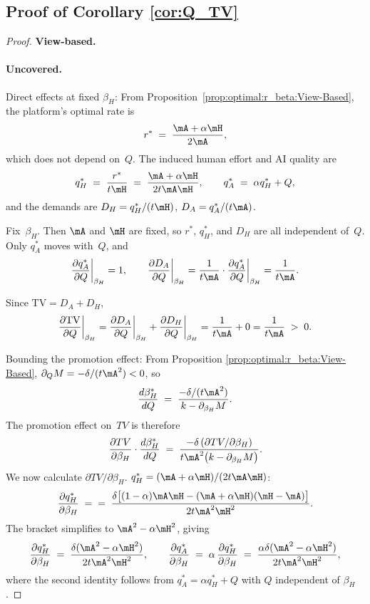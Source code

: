 \subsection*{Proof of Corollary \ref{cor:Q_TV}}
\begin{proof}
\textbf{View-based.}
\paragraph{Uncovered.}

Direct effects at fixed $\beta_H$:
From Proposition~\ref{prop:optimal:r_beta:View-Based}, the platform's optimal rate is
\[
r^* \;=\; \frac{\mA + \alpha \mH}{2\mA},
\]
which does not depend on~$Q$. The induced human effort and AI quality are
\[
q_H^* \;=\; \frac{r^*}{t\mH} \;=\; \frac{\mA + \alpha \mH}{2t\mA\mH}, 
\qquad
q_A^* \;=\; \alpha q_H^* + Q,
\]
and the demands are $D_H = q_H^*/(t\mH)$, $D_A = q_A^*/(t\mA)$.

Fix~$\beta_H$. Then $\mA$ and $\mH$ are fixed, so $r^*$, $q_H^*$, and $D_H$ are all independent of~$Q$. Only $q_A^*$ moves with~$Q$, and
\[
\frac{\partial q_A^*}{\partial Q}\bigg|_{\beta_H} = 1,
\qquad
\frac{\partial D_A}{\partial Q}\bigg|_{\beta_H}
= \frac{1}{t\mA}\cdot\frac{\partial q_A^*}{\partial Q}\bigg|_{\beta_H}
= \frac{1}{t\mA}.
\]

Since $\text{TV} = D_A + D_H$,
\[
\frac{\partial \text{TV}}{\partial Q}\bigg|_{\beta_H}
= \frac{\partial D_A}{\partial Q}\bigg|_{\beta_H}
+ \frac{\partial D_H}{\partial Q}\bigg|_{\beta_H}
= \frac{1}{t\mA} + 0
= \frac{1}{t\mA} \;>\; 0.
\]


Bounding the promotion effect:
From Proposition \ref{prop:optimal:r_beta:View-Based}, $\partial_Q M= -\delta/(t\mA^2) < 0$, so
\[
\frac{d\beta_H^*}{dQ}
\;=\; \frac{-\delta/(t\mA^2)}{k - \partial_{\beta_H}M}.
\]
The promotion effect on~$TV$ is therefore
\[
\frac{\partial TV}{\partial\beta_H}\cdot\frac{d\beta_H^*}{dQ}
\;=\; \frac{-\delta\,(\partial TV/\partial\beta_H)}{t\mA^2\bigl(k - \partial_{\beta_H}M\bigr)}.
\]
We now calculate $\partial TV/\partial\beta_H$. $q_H^*=(\mA+\alpha\mH)/(2t\mA\mH) $:
\[
\frac{\partial q_H^*}{\partial\beta_H}
\;=\;
\;=\; \frac{\delta\bigl[(1-\alpha)\mA\mH - (\mA + \alpha\mH)(\mH - \mA)\bigr]}{2t\mA^2\mH^2}.
\]
The bracket simplifies to $\mA^2 - \alpha\mH^2$, giving
\begin{equation}\label{eq:dqh-dbeta-V}
\frac{\partial q_H^*}{\partial\beta_H}
\;=\; \frac{\delta(\mA^2 - \alpha\mH^2)}{2t\mA^2\mH^2},
\qquad
\frac{\partial q_A^*}{\partial\beta_H}
\;=\; \alpha\,\frac{\partial q_H^*}{\partial\beta_H}
\;=\; \frac{\alpha\delta(\mA^2 - \alpha\mH^2)}{2t\mA^2\mH^2},
\end{equation}
where the second identity follows from $q_A^* = \alpha q_H^* + Q$ with $Q$ independent of $\beta_H$.



\end{proof}
